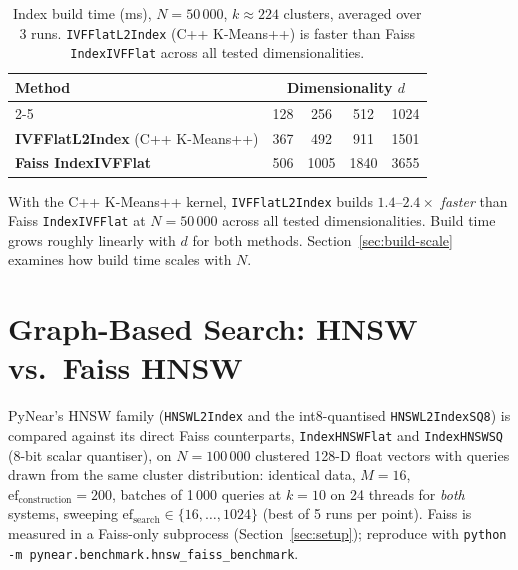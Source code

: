 \documentclass[11pt,a4paper]{article}
\begin{document}
\begin{table}[h]
\centering
\caption{Index build time (ms), $N = 50\,000$, $k \approx 224$ clusters,
  averaged over 3 runs.  \texttt{IVFFlatL2Index} (C++ K-Means++) is
  faster than Faiss \texttt{IndexIVFFlat} across all tested dimensionalities.}
\label{tab:build}
\renewcommand{\arraystretch}{1.25}
\begin{tabular}{lcccc}
\toprule
\multirow{2}{*}{\textbf{Method}} &
\multicolumn{4}{c}{\textbf{Dimensionality $d$}} \\
\cmidrule(lr){2-5}
& 128 & 256 & 512 & 1024 \\
\midrule
\textbf{IVFFlatL2Index} (C++ K-Means++) & 367 & 492 & 911 & 1501 \\
\textbf{Faiss IndexIVFFlat}              & 506 & 1005 & 1840 & 3655 \\
\bottomrule
\end{tabular}
\end{table}

With the C++ K-Means++ kernel, \texttt{IVFFlatL2Index} builds
$1.4\text{--}2.4\times$ \emph{faster} than Faiss \texttt{IndexIVFFlat} at
$N = 50\,000$ across all tested dimensionalities.
Build time grows roughly linearly with $d$ for both methods.
Section~\ref{sec:build-scale} examines how build time scales with $N$.

\section{Graph-Based Search: HNSW vs.\ Faiss HNSW}
\label{sec:hnsw}

PyNear's HNSW family (\texttt{HNSWL2Index} and the int8-quantised
\texttt{HNSWL2IndexSQ8}) is compared against its direct Faiss counterparts,
\texttt{IndexHNSWFlat} and \texttt{IndexHNSWSQ} (8-bit scalar quantiser), on
$N = 100\,000$ clustered 128-D float vectors with queries drawn from the
same cluster distribution: identical data, $M = 16$,
$\mathrm{ef}_{\mathrm{construction}} = 200$, batches of 1\,000 queries at
$k = 10$ on 24 threads for \emph{both} systems, sweeping
$\mathrm{ef}_{\mathrm{search}} \in \{16, \dots, 1024\}$ (best of 5 runs per
point).  Faiss is measured in a Faiss-only subprocess
(Section~\ref{sec:setup}); reproduce with
\texttt{python -m pynear.benchmark.hnsw\_faiss\_benchmark}.
\end{document}
